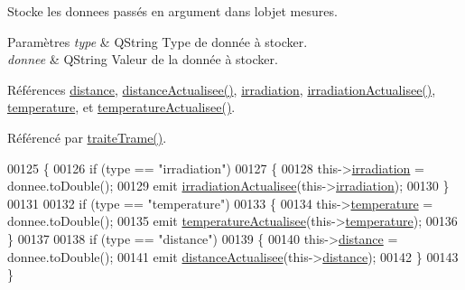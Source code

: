 Stocke les donnees passés en argument dans l\textquotesingle{}objet mesures.


\begin{DoxyParams}{Paramètres}
{\em type} & Q\+String Type de donnée à stocker. \\
\hline
{\em donnee} & Q\+String Valeur de la donnée à stocker. \\
\hline
\end{DoxyParams}


Références \hyperlink{class_mesures_a276f71168b1dcecf2051631d19aa8eeb}{distance}, \hyperlink{class_mesures_a6073f147fb08d7c5cc2ce1c9880becbe}{distance\+Actualisee()}, \hyperlink{class_mesures_a77cde7672dac5e544b7288364ec7c7b5}{irradiation}, \hyperlink{class_mesures_a8a6e4db8850930d8e4e96c98d5aa95b8}{irradiation\+Actualisee()}, \hyperlink{class_mesures_a2688d0da4acf9d91ea0befd6ed0bd140}{temperature}, et \hyperlink{class_mesures_ab13d5e64ff21fd869fe347ec1c5a246f}{temperature\+Actualisee()}.



Référencé par \hyperlink{class_mesures_a43b121b67418802b3332b195d8541481}{traite\+Trame()}.


\begin{DoxyCode}
00125 \{
00126     \textcolor{keywordflow}{if} (type == \textcolor{stringliteral}{"irradiation"})
00127     \{
00128         this->\hyperlink{class_mesures_a77cde7672dac5e544b7288364ec7c7b5}{irradiation} = donnee.toDouble();
00129         emit \hyperlink{class_mesures_a8a6e4db8850930d8e4e96c98d5aa95b8}{irradiationActualisee}(this->\hyperlink{class_mesures_a77cde7672dac5e544b7288364ec7c7b5}{irradiation});
00130     \}
00131 
00132     \textcolor{keywordflow}{if} (type == \textcolor{stringliteral}{"temperature"})
00133     \{
00134         this->\hyperlink{class_mesures_a2688d0da4acf9d91ea0befd6ed0bd140}{temperature} = donnee.toDouble();
00135         emit \hyperlink{class_mesures_ab13d5e64ff21fd869fe347ec1c5a246f}{temperatureActualisee}(this->\hyperlink{class_mesures_a2688d0da4acf9d91ea0befd6ed0bd140}{temperature});
00136     \}
00137 
00138     \textcolor{keywordflow}{if} (type == \textcolor{stringliteral}{"distance"})
00139     \{
00140         this->\hyperlink{class_mesures_a276f71168b1dcecf2051631d19aa8eeb}{distance} = donnee.toDouble();
00141         emit \hyperlink{class_mesures_a6073f147fb08d7c5cc2ce1c9880becbe}{distanceActualisee}(this->\hyperlink{class_mesures_a276f71168b1dcecf2051631d19aa8eeb}{distance});
00142     \}
00143 \}
\end{DoxyCode}
\mbox{\label{class_mesures_ab13d5e64ff21fd869fe347ec1c5a246f}} 
